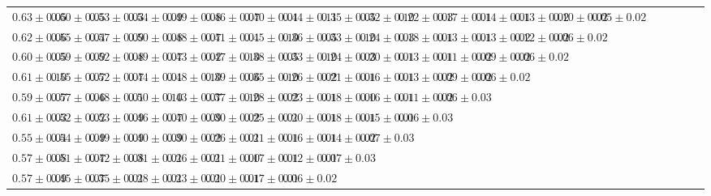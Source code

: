 \begin{table}[ht]
{{\begin{adjustbox}{width=\textwidth}
\begin{tabular}{ccccccccccccccccccccccc}
$0.63 \pm 0.05$ & $0.60 \pm 0.05$ & $0.53 \pm 0.03$ & $0.54 \pm 0.09$ & $0.49 \pm 0.08$ & $0.46 \pm 0.07$ & $0.40 \pm 0.01$ & $0.44 \pm 0.11$ & $0.35 \pm 0.05$ & $0.32 \pm 0.10$ & $0.22 \pm 0.03$ & $0.17 \pm 0.01$ & $0.14 \pm 0.01$ & $0.13 \pm 0.02$ & $0.10 \pm 0.02$ & $0.05 \pm 0.02$ &  &  &  &  &  &  &  \\
$0.62 \pm 0.06$ & $0.55 \pm 0.04$ & $0.57 \pm 0.09$ & $0.50 \pm 0.08$ & $0.48 \pm 0.07$ & $0.41 \pm 0.01$ & $0.45 \pm 0.10$ & $0.36 \pm 0.05$ & $0.33 \pm 0.10$ & $0.24 \pm 0.03$ & $0.18 \pm 0.01$ & $0.13 \pm 0.01$ & $0.13 \pm 0.02$ & $0.12 \pm 0.02$ & $0.06 \pm 0.02$ &  &  &  &  &  &  &  &  \\
$0.60 \pm 0.05$ & $0.59 \pm 0.09$ & $0.52 \pm 0.08$ & $0.49 \pm 0.07$ & $0.43 \pm 0.02$ & $0.47 \pm 0.10$ & $0.38 \pm 0.05$ & $0.33 \pm 0.10$ & $0.24 \pm 0.03$ & $0.20 \pm 0.01$ & $0.13 \pm 0.01$ & $0.11 \pm 0.02$ & $0.09 \pm 0.02$ & $0.06 \pm 0.02$ &  &  &  &  &  &  &  &  &  \\
$0.61 \pm 0.10$ & $0.55 \pm 0.07$ & $0.52 \pm 0.07$ & $0.44 \pm 0.01$ & $0.48 \pm 0.10$ & $0.39 \pm 0.06$ & $0.35 \pm 0.10$ & $0.26 \pm 0.02$ & $0.21 \pm 0.01$ & $0.16 \pm 0.01$ & $0.13 \pm 0.02$ & $0.09 \pm 0.02$ & $0.06 \pm 0.02$ &  &  &  &  &  &  &  &  &  &  \\
$0.59 \pm 0.07$ & $0.57 \pm 0.06$ & $0.48 \pm 0.01$ & $0.50 \pm 0.10$ & $0.43 \pm 0.07$ & $0.37 \pm 0.10$ & $0.28 \pm 0.02$ & $0.23 \pm 0.01$ & $0.18 \pm 0.00$ & $0.16 \pm 0.01$ & $0.11 \pm 0.02$ & $0.06 \pm 0.03$ &  &  &  &  &  &  &  &  &  &  &  \\
$0.61 \pm 0.03$ & $0.52 \pm 0.02$ & $0.53 \pm 0.09$ & $0.46 \pm 0.07$ & $0.40 \pm 0.09$ & $0.30 \pm 0.02$ & $0.25 \pm 0.01$ & $0.20 \pm 0.01$ & $0.18 \pm 0.01$ & $0.15 \pm 0.01$ & $0.06 \pm 0.03$ &  &  &  &  &  &  &  &  &  &  &  &  \\
$0.55 \pm 0.04$ & $0.54 \pm 0.09$ & $0.49 \pm 0.09$ & $0.40 \pm 0.09$ & $0.30 \pm 0.02$ & $0.26 \pm 0.01$ & $0.21 \pm 0.01$ & $0.16 \pm 0.01$ & $0.14 \pm 0.02$ & $0.07 \pm 0.03$ &  &  &  &  &  &  &  &  &  &  &  &  &  \\
$0.57 \pm 0.08$ & $0.51 \pm 0.07$ & $0.42 \pm 0.08$ & $0.31 \pm 0.01$ & $0.26 \pm 0.01$ & $0.21 \pm 0.00$ & $0.17 \pm 0.01$ & $0.12 \pm 0.01$ & $0.07 \pm 0.03$ &  &  &  &  &  &  &  &  &  &  &  &  &  &  \\
$0.57 \pm 0.09$ & $0.45 \pm 0.07$ & $0.35 \pm 0.01$ & $0.28 \pm 0.01$ & $0.23 \pm 0.01$ & $0.20 \pm 0.01$ & $0.17 \pm 0.01$ & $0.06 \pm 0.02$ &  &  &  &  &  &  &  &  &  &  &  &  &  &  &  \\

\end{tabular}
\end{adjustbox}}}
\end{table}
